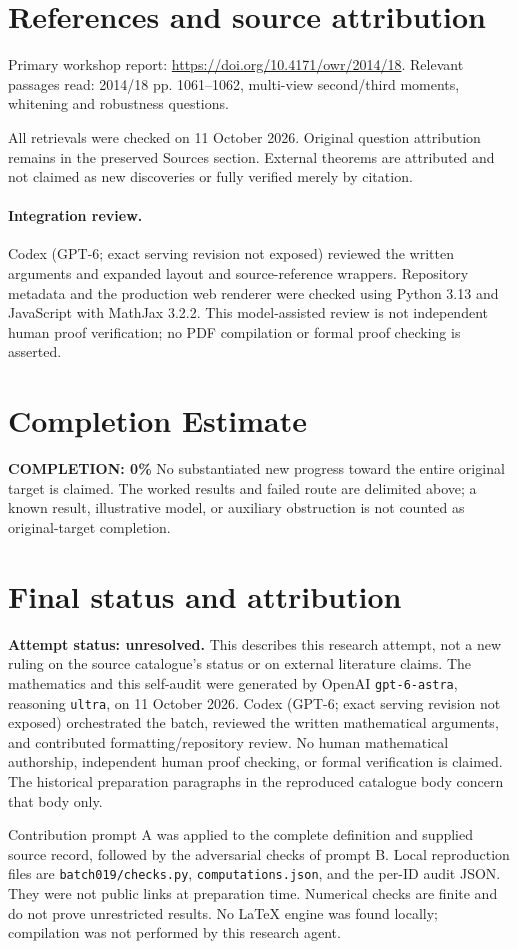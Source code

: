 \documentclass[11pt]{article}
\begin{document}
\section{References and source attribution}
Primary workshop report: \url{https://doi.org/10.4171/owr/2014/18}. Relevant passages read: 2014/18 pp. 1061--1062, multi-view second/third moments, whitening and robustness questions.

All retrievals were checked on 11 October 2026. Original question attribution remains in the preserved Sources section. External theorems are attributed and not claimed as new discoveries or fully verified merely by citation.


\paragraph{Integration review.} Codex (GPT-6; exact serving revision not exposed) reviewed the written arguments and expanded layout and source-reference wrappers. Repository metadata and the production web renderer were checked using Python 3.13 and JavaScript with MathJax 3.2.2. This model-assisted review is not independent human proof verification; no PDF compilation or formal proof checking is asserted.

\section{Completion Estimate}
\noindent\textbf{COMPLETION: 0\%}
No substantiated new progress toward the entire original target is claimed. The worked results and failed route are delimited above; a known result, illustrative model, or auxiliary obstruction is not counted as original-target completion.

\section{Final status and attribution}
\textbf{Attempt status: unresolved.} This describes this research attempt, not a new ruling on the source catalogue's status or on external literature claims.
The mathematics and this self-audit were generated by OpenAI \texttt{gpt-6-astra}, reasoning \texttt{ultra}, on 11 October 2026. Codex (GPT-6; exact serving revision not exposed) orchestrated the batch, reviewed the written mathematical arguments, and contributed formatting/repository review. No human mathematical authorship, independent human proof checking, or formal verification is claimed. The historical preparation paragraphs in the reproduced catalogue body concern that body only.

Contribution prompt A was applied to the complete definition and supplied source record, followed by the adversarial checks of prompt B. Local reproduction files are \texttt{batch019/checks.py}, \texttt{computations.json}, and the per-ID audit JSON. They were not public links at preparation time. Numerical checks are finite and do not prove unrestricted results. No LaTeX engine was found locally; compilation was not performed by this research agent.
\end{document}
